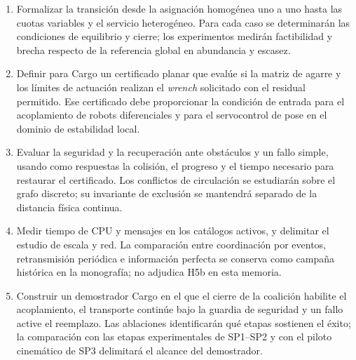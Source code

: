\begin{enumerate}[
  label=\textbf{OE\arabic*.},
  leftmargin=3.4em,
  topsep=0.4em,
  itemsep=0.55em,
  parsep=0pt
]

  \item Formalizar la transición desde la asignación homogénea uno a uno hasta
  las cuotas variables y el servicio heterogéneo. Para cada caso se determinarán
  las condiciones de equilibrio y cierre; los experimentos medirán factibilidad
  y brecha respecto de la referencia global en abundancia y escasez.

  \item Definir para Cargo un certificado planar que evalúe si la matriz de
  agarre y los límites de actuación realizan el \emph{wrench} solicitado con el
  residual permitido. Ese certificado debe proporcionar la condición de entrada
  para el acoplamiento de robots diferenciales y para el servocontrol de pose en
  el dominio de estabilidad local.

  \item Evaluar la seguridad y la recuperación ante obstáculos y un fallo
  simple, usando como respuestas la colisión, el progreso y el tiempo necesario
  para restaurar el certificado. Los conflictos de circulación se estudiarán
  sobre el grafo discreto; su invariante de exclusión se mantendrá separado de la
  distancia física continua.

  \item Medir tiempo de CPU y mensajes en los catálogos activos, y delimitar el
  estudio de escala y red. La comparación entre coordinación por eventos,
  retransmisión periódica e información perfecta se conserva como campaña
  histórica en la monografía; no adjudica H5b en esta memoria.

  \item Construir un demostrador Cargo en el que el cierre de la coalición
  habilite el acoplamiento, el transporte continúe bajo la guardia de seguridad y
  un fallo active el reemplazo. Las ablaciones identificarán qué etapas sostienen
  el éxito; la comparación con las etapas experimentales de SP1--SP2 y con el
  piloto cinemático de SP3 delimitará el alcance del demostrador.

\end{enumerate}
